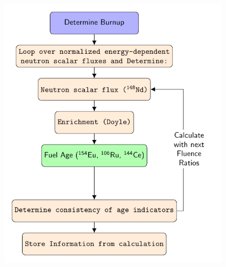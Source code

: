 \documentclass{beamer}
\begin{document}
\begin{frame}%
  \begin{figure}[H]
    \begin{center}
      \hbox{\hspace{2.5cm}\includegraphics[scale = 0.7]{figures/android.pdf}}
    \end{center}
  \end{figure}  
\end{frame}      


\end{document}
